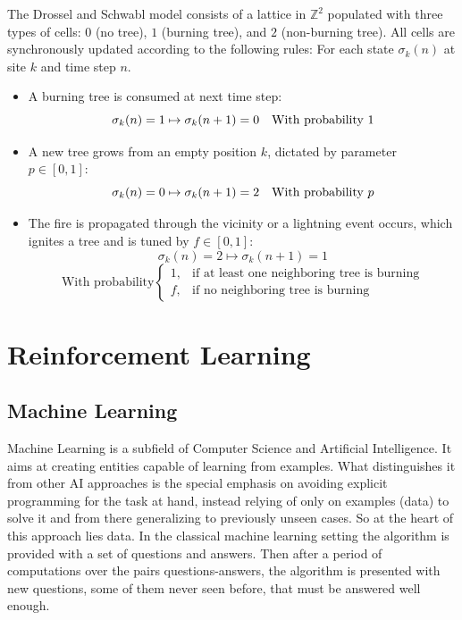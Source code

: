 \documentclass[
  12pt,
  openany]{book}
\begin{document}
The Drossel and Schwabl model consists of a lattice in \(\mathds{Z}^2\) populated with three types of cells: \(0\) (no tree), \(1\) (burning tree), and \(2\) (non-burning tree). All cells are synchronously updated according to the following rules:
For each state \(\sigma_k(n)\) at site \(k\) and time step \(n\).

\begin{itemize}
\item
  A burning tree is consumed at next time step:
  \[\sigma_k(n) = 1 \mapsto  \sigma_k(n+1) = 0 \textrm{\quad With probability}\ 1\]
\item
  A new tree grows from an empty position \(k\), dictated by parameter \(p \in [0,1]:\)
  \[\sigma_k(n) = 0 \mapsto  \sigma_k(n+1) = 2 \textrm{\quad With probability}\ p\]
\item
  The fire is propagated through the vicinity or a lightning event occurs, which ignites a tree and is tuned by \(f \in [0,1]:\)
  \[\sigma_k(n) = 2 \mapsto  \sigma_k(n+1) = 1\]
  \[\textrm{With probability} \begin{cases}
  1, & \textrm{if at least one neighboring tree is burning}\\
  f, & \textrm{if no neighboring tree is burning}
  \end{cases}\]
\end{itemize}

\hypertarget{reinforcement-learning}{%
\chapter{Reinforcement Learning}\label{reinforcement-learning}}

\hypertarget{machine-learning}{%
\section{Machine Learning}\label{machine-learning}}

Machine Learning is a subfield of Computer Science and Artificial Intelligence. It aims at creating entities capable of learning from examples. What distinguishes it from other AI approaches is the special emphasis on avoiding explicit programming for the task at hand, instead relying of only on examples (data) to solve it and from there generalizing to previously unseen cases. So at the heart of this approach lies data. In the classical machine learning setting the algorithm is provided with a set of questions and answers. Then after a period of computations over the pairs questions-answers, the algorithm is presented with new questions, some of them never seen before, that must be answered well enough.
\end{document}
